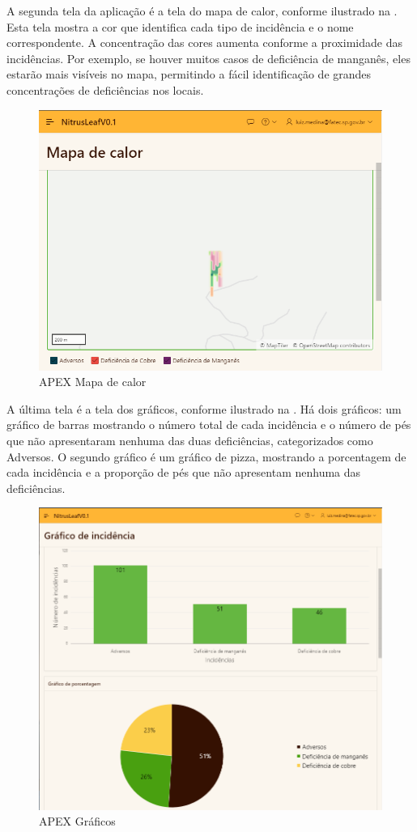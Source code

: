 A segunda tela da aplicação é a tela do mapa de calor, conforme ilustrado na . Esta tela mostra a cor que identifica cada tipo de incidência e o nome correspondente. A concentração das cores aumenta conforme a proximidade das incidências. Por exemplo, se houver muitos casos de deficiência de manganês, eles estarão mais visíveis no mapa, permitindo a fácil identificação de grandes concentrações de deficiências nos locais.

\begin{figure}[H]
\centering
\caption{APEX Mapa de calor}%
\label{fig:APEX-mapa-de-calor}
\includegraphics[width=0.8\linewidth]{Illustrations/mapadecalor.png}
\end{figure}

A última tela é a tela dos gráficos, conforme ilustrado na . Há dois gráficos: um gráfico de barras mostrando o número total de cada incidência e o número de pés que não apresentaram nenhuma das duas deficiências, categorizados como Adversos. O segundo gráfico é um gráfico de pizza, mostrando a porcentagem de cada incidência e a proporção de pés que não apresentam nenhuma das deficiências.

\begin{figure}[H]
\centering
\caption{APEX Gráficos}%
\label{fig:grafico}
\includegraphics[width=0.8\linewidth]{Illustrations/grafico.png}
\end{figure}

